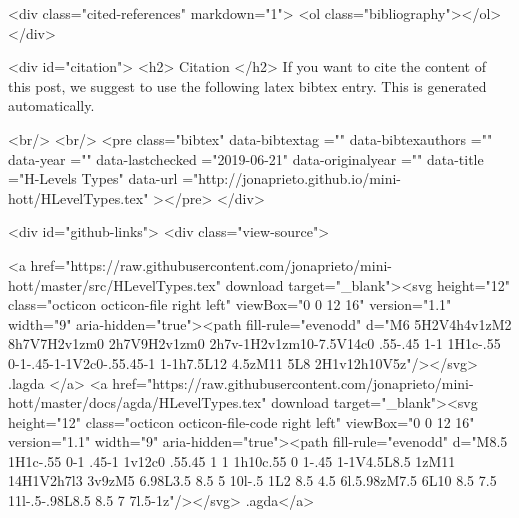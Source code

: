   <div class="cited-references" markdown="1">
  <ol class="bibliography"></ol>
  </div>


  
  <div id="citation">
  <h2> Citation </h2>
  If you want to cite the content of this post,
  we suggest to use the following latex bibtex entry.
  This is generated automatically.

  <br/>
  <br/>
  <pre class="bibtex"
       data-bibtextag =""
       data-bibtexauthors =""
       data-year =""
       data-lastchecked ="2019-06-21"
       data-originalyear =""
       data-title ="H-Levels Types"
       data-url ="http://jonaprieto.github.io/mini-hott/HLevelTypes.tex"
  ></pre>
  </div>
  

  <div id="github-links">
    <div class="view-source">
      
        <a href="https://raw.githubusercontent.com/jonaprieto/mini-hott/master/src/HLevelTypes.tex" download target="_blank"><svg height="12" class="octicon octicon-file right left" viewBox="0 0 12 16" version="1.1" width="9" aria-hidden="true"><path fill-rule="evenodd" d="M6 5H2V4h4v1zM2 8h7V7H2v1zm0 2h7V9H2v1zm0 2h7v-1H2v1zm10-7.5V14c0 .55-.45 1-1 1H1c-.55 0-1-.45-1-1V2c0-.55.45-1 1-1h7.5L12 4.5zM11 5L8 2H1v12h10V5z"/></svg> .lagda </a>
        <a href="https://raw.githubusercontent.com/jonaprieto/mini-hott/master/docs/agda/HLevelTypes.tex" download target="_blank"><svg height="12" class="octicon octicon-file-code right left" viewBox="0 0 12 16" version="1.1" width="9" aria-hidden="true"><path fill-rule="evenodd" d="M8.5 1H1c-.55 0-1 .45-1 1v12c0 .55.45 1 1 1h10c.55 0 1-.45 1-1V4.5L8.5 1zM11 14H1V2h7l3 3v9zM5 6.98L3.5 8.5 5 10l-.5 1L2 8.5 4.5 6l.5.98zM7.5 6L10 8.5 7.5 11l-.5-.98L8.5 8.5 7 7l.5-1z"/></svg> .agda</a>
      
